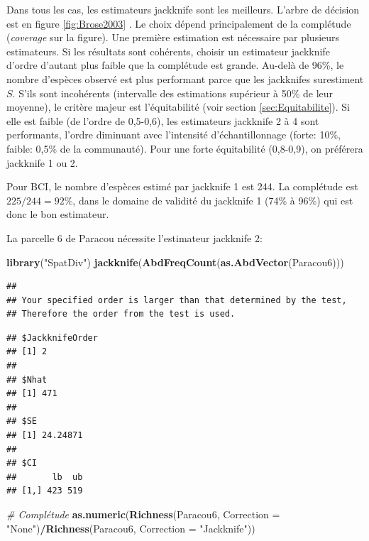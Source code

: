 \documentclass[
  11pt,
  french,
  a4paper,
  extrafontsizes,onecolumn,openright
  ]{memoir}
\newenvironment{Shaded}{\begin{snugshade}}{\end{snugshade}}
\newcommand{\CommentTok}[1]{\textcolor[rgb]{0.56,0.35,0.01}{\textit{#1}}}
\newcommand{\DataTypeTok}[1]{\textcolor[rgb]{0.13,0.29,0.53}{#1}}
\newcommand{\KeywordTok}[1]{\textcolor[rgb]{0.13,0.29,0.53}{\textbf{#1}}}
\newcommand{\NormalTok}[1]{#1}
\newcommand{\OperatorTok}[1]{\textcolor[rgb]{0.81,0.36,0.00}{\textbf{#1}}}
\newcommand{\StringTok}[1]{\textcolor[rgb]{0.31,0.60,0.02}{#1}}
\begin{document}
\normalsize

Dans tous les cas, les estimateurs jackknife sont les meilleurs.
L'arbre de décision est en figure \ref{fig:Brose2003} \autocite[fig.~6]{Brose2003}.
Le choix dépend principalement de la complétude (\emph{coverage} sur la figure).
Une première estimation est nécessaire par plusieurs estimateurs.
Si les résultats sont cohérents, choisir un estimateur jackknife d'ordre d'autant plus faible que la complétude est grande.
Au-delà de 96\%, le nombre d'espèces observé est plus performant parce que les jackknifes surestiment \(S\).
S'ils sont incohérents (intervalle des estimations supérieur à 50\% de leur moyenne), le critère majeur est l'équitabilité (voir section \ref{sec:Equitabilite}).
Si elle est faible (de l'ordre de 0,5-0,6), les estimateurs jackknife 2 à 4 sont performants, l'ordre diminuant avec l'intensité d'échantillonnage (forte: 10\%, faible: 0,5\% de la communauté).
Pour une forte équitabilité (0,8-0,9), on préférera jackknife 1 ou 2.

Pour BCI, le nombre d'espèces estimé par jackknife 1 est 244.
La complétude est \({225}/{244}=92\%\), dans le domaine de validité du jackknife 1 (74\% à 96\%) qui est donc le bon estimateur.

La parcelle 6 de Paracou nécessite l'estimateur jackknife 2:

\scriptsize

\begin{Shaded}
\begin{Highlighting}[]
\KeywordTok{library}\NormalTok{(}\StringTok{"SpatDiv"}\NormalTok{)}
\KeywordTok{jackknife}\NormalTok{(}\KeywordTok{AbdFreqCount}\NormalTok{(}\KeywordTok{as.AbdVector}\NormalTok{(Paracou6)))}
\end{Highlighting}
\end{Shaded}

\begin{verbatim}
## 
## Your specified order is larger than that determined by the test, 
## Therefore the order from the test is used.
\end{verbatim}

\begin{verbatim}
## $JackknifeOrder
## [1] 2
## 
## $Nhat
## [1] 471
## 
## $SE
## [1] 24.24871
## 
## $CI
##       lb  ub
## [1,] 423 519
\end{verbatim}

\begin{Shaded}
\begin{Highlighting}[]
\CommentTok{# Complétude}
\KeywordTok{as.numeric}\NormalTok{(}\KeywordTok{Richness}\NormalTok{(Paracou6, }\DataTypeTok{Correction =} \StringTok{"None"}\NormalTok{)}\OperatorTok{/}\KeywordTok{Richness}\NormalTok{(Paracou6, }
    \DataTypeTok{Correction =} \StringTok{"Jackknife"}\NormalTok{))}
\end{Highlighting}
\end{Shaded}
\end{document}
